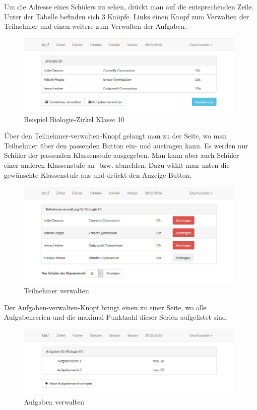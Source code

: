 Um die Adresse eines Schülers zu sehen, drückt man auf die entsprechenden Zeile. Unter der Tabelle befinden sich 3 Knöpfe. Links einen Knopf zum Verwalten der Teilnehmer und einen weitere zum Verwalten der Aufgaben. 

\begin{figure}[h]
	\centering
	\includegraphics[scale=.5]{bilder/Zirkel_Biologie.png}
	\caption{Beispiel Biologie-Zirkel Klasse 10}
	\label{abb:beispiel}
\end{figure}

Über den Teilnehmer-verwalten-Knopf gelangt man zu der Seite, wo man Teilnehmer über den passenden Button ein- und austragen kann. Es werden nur Schüler der passenden Klassenstufe ausgegeben. Man kann aber auch Schüler einer anderen Klassenstufe an- bzw. abmelden. Dazu wählt man unten die gewünschte Klassenstufe aus und drückt den Anzeige-Button. 

\begin{figure}[h]
	\centering
	\includegraphics[scale=.5]{bilder/Teilnehmer_verwalten.png}
	\caption{Teilnehmer verwalten}
\end{figure}

\newpage
Der Aufgaben-verwalten-Knopf bringt einen zu einer Seite, wo alle Aufgabenserien und die maximal Punktzahl dieser Serien aufgelistet sind. 

\begin{figure}[h]
	\centering
	\includegraphics[scale=.5]{bilder/Aufgaben_verwalten.png}
	\caption{Aufgaben verwalten}
\end{figure}

